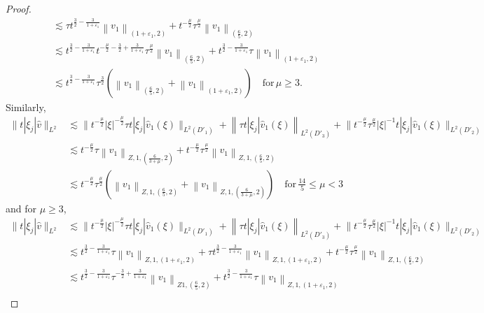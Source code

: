 \documentclass[11pt,twoside]{article}
\newcommand{\f}{\frac}
\theoremstyle{plain}
\theoremstyle{definition}
\theoremstyle{remark}
\numberwithin{equation}{section}
\begin{document}
\begin{proof}
\begin{equation}
\begin{aligned}
& \lesssim \tau t^{\f32-\frac{3}{1+\varepsilon_1}}\left\|v_1\right\|_{\left(1+\varepsilon_1, 2\right)}+t^{-\f{\mu}{2}} \tau^{\f{\mu}{2}}\left\|v_1\right\|_{\left(\f65, 2\right)} \\
& \lesssim t^{\f32-\frac{3}{1+\varepsilon_1}}t^{-\f{\mu}{2}-\f32+\frac{3}{1+\varepsilon_1}} \tau^{\f{\mu}{2}}\left\|v_1\right\|_{\left(\f65, 2\right)}+ t^{\f32-\frac{3}{1+\varepsilon_1}} \tau\left\|v_1\right\|_{\left(1+\varepsilon_1, 2\right)}\\
& \lesssim t^{\f32-\frac{3}{1+\varepsilon_1}} \tau^{\f32}(\left\|v_1\right\|_{\left(\f65, 2\right)}+ \left\|v_1\right\|_{\left(1+\varepsilon_1, 2\right)})\quad\text{for}\,\mu\geq3.
\end{aligned}
\end{equation}
Similarly,
\begin{equation}\label{l10'}
\begin{aligned}
\|t|\xi_j|\hat{v}\|_{L^2} & \lesssim\big\|t^{-\frac{\mu}{2}} |\xi|^{-\frac{\mu}{2}}\tau t|\xi_j| \hat{v}_1(\xi)\big\|_{L^2(D'_1)}+\left\|\tau t|\xi_j| \hat{v}_1(\xi)\right\|_{L^2(D'_3)} +\big\|t^{-\frac{\mu}{2}}\tau^{\frac{\mu}{2}} |\xi|^{-1}t|\xi_j| \hat{v}_1(\xi)\big\|_{L^2(D'_2)} \\
& \lesssim t^{-\f{\mu}{2}} \tau\left\|v_1\right\|_{Z, 1, \left(\f{6}{3+\mu}, 2\right)}+t^{-\f{\mu}{2}} \tau^{\f{\mu}{2}}\left\|v_1\right\|_{Z, 1, \left(\f65, 2\right)} \\
& \lesssim t^{-\f{\mu}{2}} \tau^{\f{\mu}{2}}(\left\|v_1\right\|_{Z, 1, \left(\f65, 2\right)}+\left\|v_1\right\|_{Z, 1, \left(\f{6}{3+\mu}, 2\right)})\quad\text{for}\,\f{14}{5}\leq\mu<3
\end{aligned}
\end{equation}
and for $\mu\geq3$,
\begin{equation}\label{l10}
\begin{aligned}
\|t|\xi_j|\hat{v}\|_{L^2} & \lesssim\big\|t^{-\frac{\mu}{2}} |\xi|^{-\frac{\mu}{2}}\tau t|\xi_j| \hat{v}_1(\xi)\big\|_{L^2(D'_1)}+\left\|\tau t|\xi_j| \hat{v}_1(\xi)\right\|_{L^2(D'_3)} +\big\|t^{-\frac{\mu}{2}}\tau^{\frac{\mu}{2}} |\xi|^{-1}t|\xi_j| \hat{v}_1(\xi)\big\|_{L^2(D'_2)} \\
& \lesssim t^{\f32-\frac{3}{1+\varepsilon_1}} \tau\left\|v_1\right\|_{Z, 1, \left(1+\varepsilon_1, 2\right)}+\tau t^{\f32-\frac{3}{1+\varepsilon_1}}\left\|v_1\right\|_{Z, 1, \left(1+\varepsilon_1, 2\right)}+t^{-\f{\mu}{2}} \tau^{\f{\mu}{2}}\left\|v_1\right\|_{Z, 1, \left(\f65, 2\right)} \\
&  \lesssim t^{\f32-\frac{3}{1+\varepsilon_1}} \tau^{-\f32+\frac{3}{1+\varepsilon_1}}\left\|v_1\right\|_{Z 1, \left(\f65, 2\right)}+ t^{\f32-\frac{3}{1+\varepsilon_1}} \tau\left\|v_1\right\|_{Z, 1, \left(1+\varepsilon_1, 2\right)}\\

\end{aligned}
\end{equation}
\end{proof}
\end{document}
